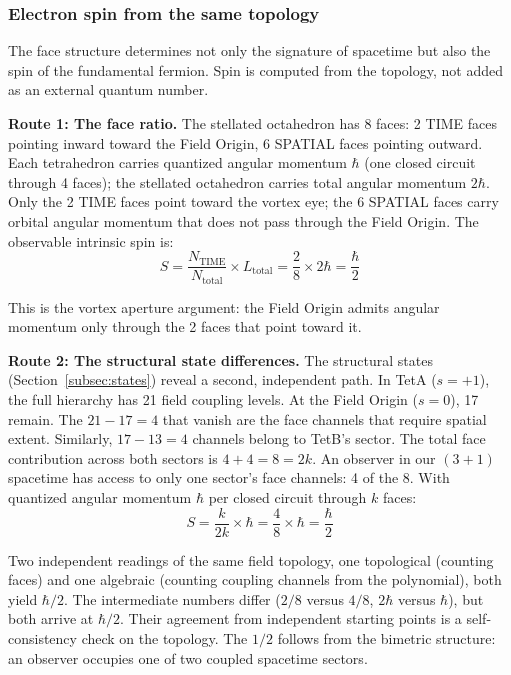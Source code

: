 \documentclass[aps,prd,preprint,superscriptaddress,showpacs,preprintnumbers,amsmath,amssymb,nofootinbib]{revtex4-2}
\begin{document}
\subsubsection*{Electron spin from the same topology}

The face structure determines not only the signature of spacetime but also the spin of the fundamental fermion. Spin is computed from the topology, not added as an external quantum number.

\textbf{Route 1: The face ratio.} The stellated octahedron has 8 faces: 2 TIME faces pointing inward toward the Field Origin, 6 SPATIAL faces pointing outward. Each tetrahedron carries quantized angular momentum $\hbar$ (one closed circuit through 4 faces); the stellated octahedron carries total angular momentum $2\hbar$. Only the 2 TIME faces point toward the vortex eye; the 6 SPATIAL faces carry orbital angular momentum that does not pass through the Field Origin. The observable intrinsic spin is:
\begin{equation}
S = \frac{N_{\text{TIME}}}{N_{\text{total}}} \times L_{\text{total}} = \frac{2}{8} \times 2\hbar = \frac{\hbar}{2}
\label{eq:spin}
\end{equation}

This is the vortex aperture argument: the Field Origin admits angular momentum only through the 2 faces that point toward it.

\textbf{Route 2: The structural state differences.} The structural states (Section~\ref{subsec:states}) reveal a second, independent path. In TetA ($s = +1$), the full hierarchy has 21 field coupling levels. At the Field Origin ($s = 0$), 17 remain. The $21 - 17 = 4$ that vanish are the face channels that require spatial extent. Similarly, $17 - 13 = 4$ channels belong to TetB's sector. The total face contribution across both sectors is $4 + 4 = 8 = 2k$. An observer in our $(3{+}1)$ spacetime has access to only one sector's face channels: 4 of the 8. With quantized angular momentum $\hbar$ per closed circuit through $k$ faces:
\begin{equation}
S = \frac{k}{2k} \times \hbar = \frac{4}{8} \times \hbar = \frac{\hbar}{2}
\label{eq:spin-route2}
\end{equation}

Two independent readings of the same field topology, one topological (counting faces) and one algebraic (counting coupling channels from the polynomial), both yield $\hbar/2$. The intermediate numbers differ ($2/8$ versus $4/8$, $2\hbar$ versus $\hbar$), but both arrive at $\hbar/2$. Their agreement from independent starting points is a self-consistency check on the topology. The $1/2$ follows from the bimetric structure: an observer occupies one of two coupled spacetime sectors.
\end{document}
